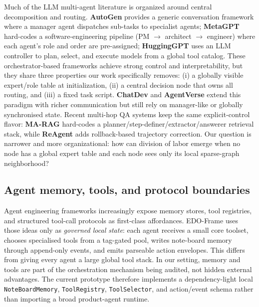 \documentclass[11pt]{article}
\begin{document}
Much of the LLM multi-agent literature is organized around central decomposition and routing. \textbf{AutoGen} \citep{wu2023autogen} provides a generic conversation framework where a manager agent dispatches sub-tasks to specialist agents; \textbf{MetaGPT} \citep{hong2024metagpt} hard-codes a software-engineering pipeline (PM $\to$ architect $\to$ engineer) where each agent's role and order are pre-assigned; \textbf{HuggingGPT} \citep{shen2023hugginggpt} uses an LLM controller to plan, select, and execute models from a global tool catalog. These orchestrator-based frameworks achieve strong control and interpretability, but they share three properties our work specifically removes: (i) a globally visible expert/role table at initialization, (ii) a central decision node that owns all routing, and (iii) a fixed task script. \textbf{ChatDev} \citep{qian2024chatdev} and \textbf{AgentVerse} \citep{chen2024agentverse} extend this paradigm with richer communication but still rely on manager-like or globally synchronised state. Recent multi-hop QA systems keep the same explicit-control flavor: \textbf{MA-RAG} \citep{nguyen2025marag} hard-codes a planner/step-definer/extractor/answerer retrieval stack, while \textbf{ReAgent} \citep{zhao2025reagent} adds rollback-based trajectory correction. Our question is narrower and more organizational: how can division of labor emerge when no node has a global expert table and each node sees only its local sparse-graph neighborhood?

\subsection{Agent memory, tools, and protocol boundaries}

Agent engineering frameworks increasingly expose memory stores, tool registries, and structured tool-call protocols as first-class affordances. EDO-Frame uses those ideas only as \emph{governed local state}: each agent receives a small core toolset, chooses specialised tools from a tag-gated pool, writes note-board memory through append-only events, and emits parseable action envelopes. This differs from giving every agent a large global tool stack. In our setting, memory and tools are part of the orchestration mechanism being audited, not hidden external advantages. The current prototype therefore implements a dependency-light local \texttt{NoteBoardMemory}, \texttt{ToolRegistry}, \texttt{ToolSelector}, and action/event schema rather than importing a broad product-agent runtime.
\end{document}
